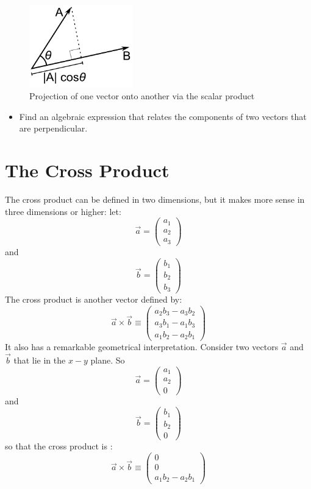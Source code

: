 \documentclass[a4wide]{article}
\begin{document}
\begin{figure}[h]
  \begin{center}
\includegraphics[width=0.4\textwidth]{Dot_Product.pdf}
  \end{center}
  \caption{Projection of one vector onto another via the scalar product}
  \label{fig-dot}
\end{figure}

\begin{itemize}
  \item Find an algebraic expression that relates the components of two vectors that are perpendicular. 
\end{itemize}

\section*{The Cross Product}
The cross product can be defined in two dimensions, but it makes more sense in three dimensions or higher:
let:
$$
\vec{a} = \left( \begin{array}{c} a_1 \\ a_2 \\ a_3 \end{array} \right)
$$
and
$$
\vec{b} = \left( \begin{array}{c} b_1 \\ b_2 \\ b_3 \end{array} \right)
$$
The cross product is another vector defined by:
$$
\vec{a} \times \vec{b} \equiv  \left( \begin{array}{c} a_2 b_3 - a_3 b_2 \\ a_3 b_1 - a_1 b_3 \\ a_1 b_2 - a_2 b_1 \end{array} \right)
$$
It also has a remarkable geometrical interpretation. Consider two vectors $\vec{a}$ and $\vec{b}$ that lie in the $x-y$ plane. So
$$
\vec{a} = \left( \begin{array}{c} a_1 \\ a_2 \\ 0 \end{array} \right)
$$
and
$$
\vec{b} = \left( \begin{array}{c} b_1 \\ b_2 \\ 0 \end{array} \right)
$$
so that the cross product is :
$$
\vec{a} \times \vec{b} \equiv  \left( \begin{array}{c} 0 \\ 0 \\ a_1 b_2 - a_2 b_1 \end{array} \right)
$$
\end{document}
